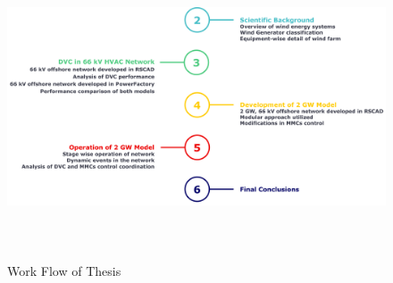 \begin{figure}[H]
\centering
    \includegraphics[height = 9cm,width = 16.5cm]{Diagrams/Chapter_1/Thesis_flowchart.pdf}
    \caption{Work Flow of Thesis}
    \label{fig:Thesis_outline}
\end{figure}
